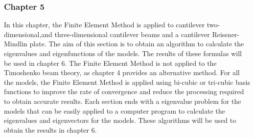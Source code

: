 \documentclass[../main.tex]{subfiles}
\begin{document}
\subsubsection{Chapter 5}
In this chapter, the Finite Element Method is applied to cantilever two-dimensional,and three-dimensional cantilever beams and a cantilever Reissner-Mindlin plate. The aim of this section is to obtain an algorithm to calculate the eigenvalues and eigenfunctions of the models. The results of these formulas will be used in chapter 6. The Finite Element Method is not applied to the Timoshenko beam theory, as chapter 4 provides an alternative method. For all the models, the Finite Element Method is applied using bi-cubic or tri-cubic basis functions to improve the rate of convergence and reduce the processing required to obtain accurate results. Each section ends with a eigenvalue problem for the models that can be easily applied to a computer program to calculate the eigenvalues and eigenvectors for the models. These algorithms will be used to obtain the results in chapter 6.
\end{document}
